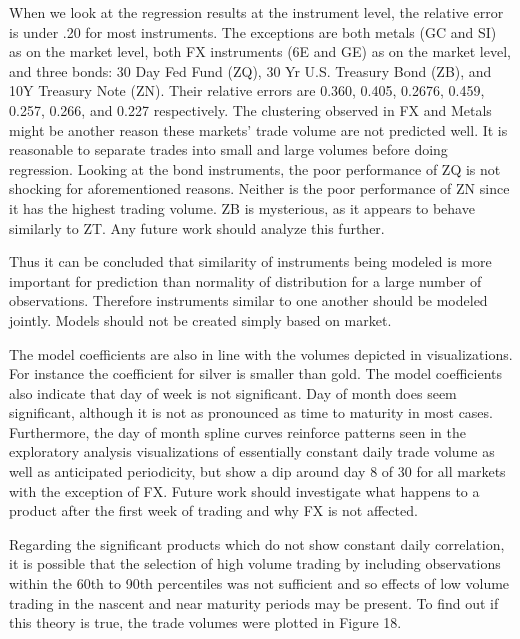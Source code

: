 \documentclass[12pt]{article}
\begin{document}
When we look at the regression results at the instrument level, the relative error is under .20 for most instruments. The exceptions are both metals (GC and SI) as on the market level, both FX instruments (6E and GE)  as on the market level, and three bonds: 30 Day Fed Fund (ZQ), 30 Yr U.S. Treasury Bond (ZB), and 10Y Treasury Note (ZN). Their relative errors are 0.360, 0.405, 0.2676, 0.459, 0.257, 0.266, and 0.227 respectively. The clustering observed in FX and Metals might be another reason these markets' trade volume are not predicted well. It is reasonable to separate trades into small and large volumes before doing regression. Looking at the bond instruments, the poor performance of ZQ is not shocking for aforementioned reasons. Neither is the poor performance of ZN since it has the highest trading volume. ZB is mysterious, as it appears to behave similarly to ZT. Any future work should analyze this further.

Thus it can be concluded that similarity of instruments being modeled is more important for prediction than normality of distribution for a large number of observations. Therefore instruments similar to one another should be modeled jointly. Models should not be created simply based on market. 


The model coefficients are also in line with the volumes depicted in visualizations. For instance the coefficient for silver is smaller than gold. The model coefficients also indicate that day of week is not significant. Day of month does seem significant, although it is not as pronounced as time to maturity in most cases. Furthermore, the day of month spline curves reinforce patterns seen in the exploratory analysis visualizations of essentially constant daily trade volume as well as anticipated periodicity, but show a dip around day 8 of 30 for all markets with the exception of FX. Future work should investigate what happens to a product after the first week of trading and why FX is not affected.



Regarding the significant products which do not show constant daily correlation, it is possible that the selection of high volume trading by including observations within the 60th to 90th percentiles was not sufficient and so effects of low volume trading in the nascent and near maturity periods may be present. To find out if this theory is true, the trade volumes were plotted in Figure 18.
\end{document}
